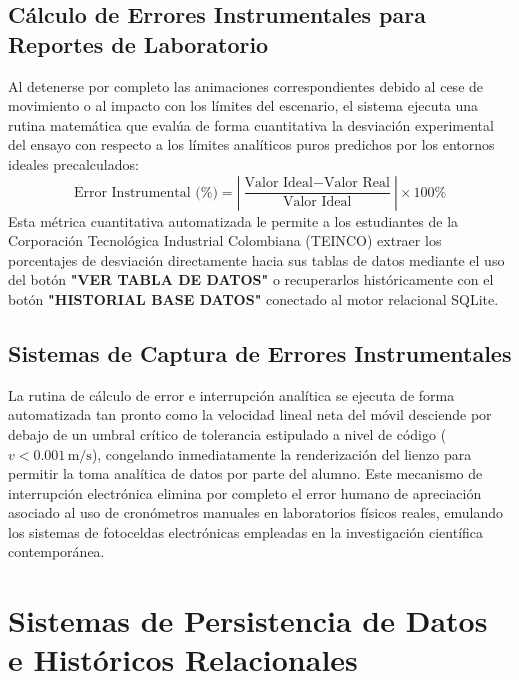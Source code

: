 \documentclass[11pt,a4paper]{article}
\begin{document}
	\subsection{Cálculo de Errores Instrumentales para Reportes de Laboratorio}
	Al detenerse por completo las animaciones correspondientes debido al cese de movimiento o al impacto con los límites del escenario, el sistema ejecuta una rutina matemática que evalúa de forma cuantitativa la desviación experimental del ensayo con respecto a los límites analíticos puros predichos por los entornos ideales precalculados:
	\begin{equation}
		\text{Error Instrumental (\%)} = \left| \frac{\text{Valor Ideal} - \text{Valor Real}}{\text{Valor Ideal}} \right| \times 100\%
	\end{equation}
	Esta métrica cuantitativa automatizada le permite a los estudiantes de la Corporación Tecnológica Industrial Colombiana (TEINCO) extraer los porcentajes de desviación directamente hacia sus tablas de datos mediante el uso del botón \textbf{"VER TABLA DE DATOS"} o recuperarlos históricamente con el botón \textbf{"HISTORIAL BASE DATOS"} conectado al motor relacional SQLite.
	
	\subsection{Sistemas de Captura de Errores Instrumentales}
	La rutina de cálculo de error e interrupción analítica se ejecuta de forma automatizada tan pronto como la velocidad lineal neta del móvil desciende por debajo de un umbral crítico de tolerancia estipulado a nivel de código ($v < 0.001\,\text{m/s}$), congelando inmediatamente la renderización del lienzo para permitir la toma analítica de datos por parte del alumno. Este mecanismo de interrupción electrónica elimina por completo el error humano de apreciación asociado al uso de cronómetros manuales en laboratorios físicos reales, emulando los sistemas de fotoceldas electrónicas empleadas en la investigación científica contemporánea.
	
	\section{Sistemas de Persistencia de Datos e Históricos Relacionales}
	
\end{document}
